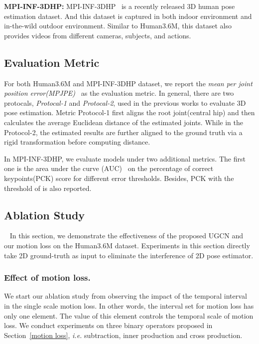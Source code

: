 \documentclass[runningheads]{llncs}
\begin{document}
\noindent
\textbf{MPI-INF-3DHP:}
MPI-INF-3DHP~\cite{mono-3dhp2017} is a recently released 3D human pose estimation dataset.
And this dataset is captured in both indoor environment and in-the-wild outdoor environment.
Similar to Human3.6M, this dataset also provides videos from different cameras, subjects, and actions.

\subsection{Evaluation Metric}
For both Human3.6M and MPI-INF-3DHP dataset, we report the \textit{mean per joint position error(MPJPE)}~\cite{lin2019trajectory,pavllo20193d,cai2019exploiting} as the evaluation metric.
In general, there are two protocals, \textit{Protocal-1} and \textit{Protocal-2}, used in the previous works to evaluate 3D pose estimation.
Metric Protocol-1 first aligns the root joint(central hip) and then calculates the average Euclidean distance of the estimated joints.
While in the Protocol-2, the estimated results are further aligned to the ground truth via a rigid transformation before computing distance.

In MPI-INF-3DHP, we evaluate models under two additional metrics.
The first one is the area under the curve (AUC)~\cite{zimmermann2017learning} on the percentage of correct keypoints(PCK) score for different error
thresholds. Besides, PCK with the threshold of  is also reported.

\subsection{Ablation Study}~\label{sec: ablation}
In this section, we demonstrate the effectiveness of the proposed UGCN and our motion loss on the Human3.6M dataset.
Experiments in this section directly take 2D ground-truth as input to eliminate the interference of 2D pose estimator.





\subsubsection{Effect of motion loss.}


    We start our ablation study from observing the impact of the temporal interval  in the single scale motion loss.
    In other words, the interval set for motion loss has only one element.
    The value of this element controls the temporal scale of motion loss.
    We conduct experiments on three binary operators proposed in Section~\ref{motion loss}, \emph{i.e.} subtraction, inner production and cross production.
\end{document}
